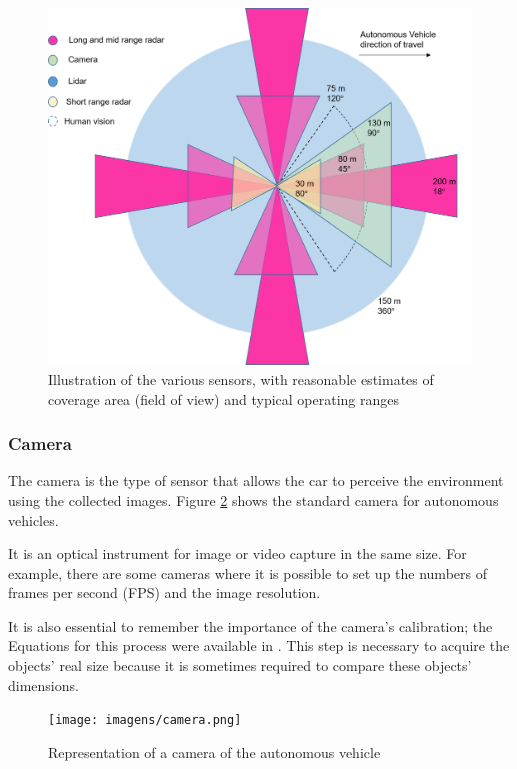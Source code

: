 \begin{figure}[H]
\centering
\includegraphics[scale=0.5]{imagens/Imagem1.png}
\caption{Illustration of the various sensors, with reasonable estimates of coverage area (field of view) and typical operating ranges}
\label{fig:sensorsrange}
\end{figure}



\subsubsection{Camera}\label{sub:camera}
The camera is the type of sensor that allows the car to perceive the environment using the collected images. Figure \ref{fig:camera} shows the standard camera for autonomous vehicles.

It is an optical instrument for image or video capture in the same size. For example, there are some cameras where it is possible to set up the numbers of frames per second (FPS) and the image resolution. 

It is also essential to remember the importance of the camera's calibration; the Equations for this process were available in \cite{888718}. This step is necessary to acquire the objects' real size because it is sometimes required to compare these objects' dimensions. 

\begin{figure}[H]
\centering
\texttt{[image: imagens/camera.png]}
\caption{Representation of a camera of the autonomous vehicle \cite{site-camera}}
\label{fig:camera}
\end{figure}

